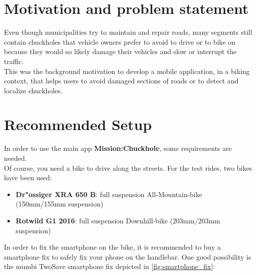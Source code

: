 \documentclass[10pt,a4paper]{article} %
\begin{document}
    \pagestyle{plain}
    \title{\rmfamily\normalfont{}}
    \author{}
    \date{} %
    
    \maketitle
    

    \tableofcontents
    


    \section{Motivation and problem statement}

	

Even though municipalities try to maintain and repair roads, many segments still contain chuckholes that vehicle owners prefer to avoid to drive or to bike on because they would so likely damage their vehicles and slow or interrupt the traffic.\\
This was the background motivation to develop a mobile application, in a biking context, that helps users to avoid damaged sections of roads or to detect and localize chuckholes.

    \section{Recommended Setup}

	In order to use the main app \textbf{Mission:Chuckhole}, some requirements are needed.\\
	Of course, you need a bike to drive along the streets.
	For the test rides, two bikes have been used:

	\begin{itemize}
		\item \textbf{Dr"ossiger XRA 650 B}: full suspension All-Mountain-bike (150mm/155mm suspension)
		\item \textbf{Rotwild G1 2016}: full suspension Downhill-bike (203mm/203mm suspension)
	\end{itemize}
	In order to fix the smartphone on the bike, it is recommended to buy a smartphone fix to safely fix your phone on the handlebar. One good possibility is the mumbi TwoSave smartphone fix depicted in \autoref{fig:smartphone_fix}:
	
\end{document}
